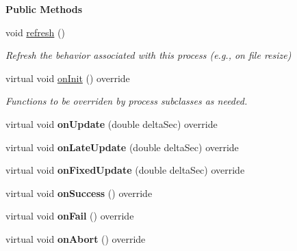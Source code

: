 \begin{Indent}\textbf{ Public Methods}\par
\begin{DoxyCompactItemize}
\item 
\mbox{\label{classrev_1_1_scripted_process_a0b98b3dc0daea4f005faeb1adabb99e6}} 
void \mbox{\hyperlink{classrev_1_1_scripted_process_a0b98b3dc0daea4f005faeb1adabb99e6}{refresh}} ()
\begin{DoxyCompactList}\small\item\em Refresh the behavior associated with this process (e.\+g., on file resize) \end{DoxyCompactList}\item 
\mbox{\label{classrev_1_1_scripted_process_a6ab6bcce9ee86c2b8deca290014ae9ea}} 
virtual void \mbox{\hyperlink{classrev_1_1_scripted_process_a6ab6bcce9ee86c2b8deca290014ae9ea}{on\+Init}} () override
\begin{DoxyCompactList}\small\item\em Functions to be overriden by process subclasses as needed. \end{DoxyCompactList}\item 
\mbox{\label{classrev_1_1_scripted_process_a5070aec52f66176beb017f3a0251264d}} 
virtual void {\bfseries on\+Update} (double delta\+Sec) override
\item 
\mbox{\label{classrev_1_1_scripted_process_a8252ab2a5b534c1f935927eacab4ef06}} 
virtual void {\bfseries on\+Late\+Update} (double delta\+Sec) override
\item 
\mbox{\label{classrev_1_1_scripted_process_a26c76f5491c4c3f0a45929aa688c1fc9}} 
virtual void {\bfseries on\+Fixed\+Update} (double delta\+Sec) override
\item 
\mbox{\label{classrev_1_1_scripted_process_a6c1f483cbd12bb97f8d5f9992b65de74}} 
virtual void {\bfseries on\+Success} () override
\item 
\mbox{\label{classrev_1_1_scripted_process_a91222d15333a42c8f265703909e48c91}} 
virtual void {\bfseries on\+Fail} () override
\item 
\mbox{\label{classrev_1_1_scripted_process_ac3c7e5dd5f32116e939f918aaef4d9db}} 
virtual void {\bfseries on\+Abort} () override
\end{DoxyCompactItemize}
\end{Indent}
